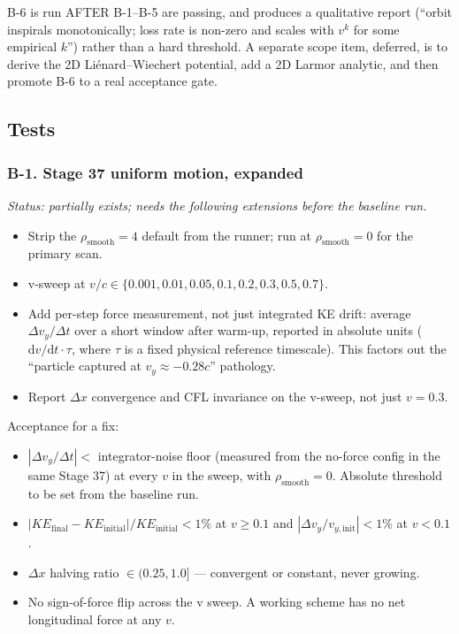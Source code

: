 \documentclass[11pt,a4paper]{article}
\newcommand{\dd}{\mathrm{d}}
\begin{document}
B-6 is run AFTER B-1--B-5 are passing, and produces a qualitative
report (``orbit inspirals monotonically; loss rate is non-zero and
scales with $v^k$ for some empirical $k$'') rather than a hard
threshold.  A separate scope item, deferred, is to derive the 2D
Liénard--Wiechert potential, add a 2D Larmor analytic, and then
promote B-6 to a real acceptance gate.

\subsection{Tests}

\subsubsection*{B-1.  Stage 37 uniform motion, expanded}

\emph{Status: partially exists; needs the following extensions before
the baseline run.}

\begin{itemize}
  \item Strip the $\rho_{\mathrm{smooth}}=4$ default from the runner;
    run at $\rho_{\mathrm{smooth}}=0$ for the primary scan.
  \item v-sweep at $v/c \in \{0.001, 0.01, 0.05, 0.1, 0.2, 0.3, 0.5,
    0.7\}$.
  \item Add per-step force measurement, not just integrated KE drift:
    average $\Delta v_y / \Delta t$ over a short window after warm-up,
    reported in absolute units ($\dd v / \dd t \cdot \tau$, where
    $\tau$ is a fixed physical reference timescale).  This factors
    out the ``particle captured at $v_y \approx -0.28c$'' pathology.
  \item Report $\Delta x$ convergence and CFL invariance on the
    v-sweep, not just $v = 0.3$.
\end{itemize}

Acceptance for a fix:
\begin{itemize}
  \item $|\Delta v_y / \Delta t| <$ integrator-noise floor (measured
    from the no-force config in the same Stage 37) at every $v$ in
    the sweep, with $\rho_{\mathrm{smooth}}=0$.  Absolute threshold
    to be set from the baseline run.
  \item $|KE_{\mathrm{final}} - KE_{\mathrm{initial}}| / KE_{\mathrm{initial}} < 1\%$ at $v \ge 0.1$
    and $|\Delta v_y / v_{y,\mathrm{init}}| < 1\%$ at $v < 0.1$.
  \item $\Delta x$ halving ratio $\in (0.25, 1.0]$ --- convergent or
    constant, never growing.
  \item No sign-of-force flip across the v sweep.  A working scheme
    has no net longitudinal force at any $v$.
\end{itemize}
\end{document}
